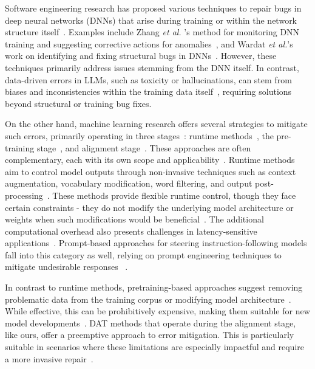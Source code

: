 Software engineering research has proposed various techniques to repair bugs in deep neural networks (DNNs) that arise during training or within the network structure itself~\cite{zhang2019apricot,zhang2021autotrainer,wardat2022deepdiagnosis,ma2018mode}. Examples include Zhang \textit{et al.} 's method for monitoring DNN training and suggesting corrective actions for anomalies~\cite{zhang2021autotrainer}, and Wardat \textit{et al.}'s work on identifying and fixing structural bugs in DNNs~\cite{wardat2022deepdiagnosis}. However, these techniques primarily address issues stemming from the DNN itself. In contrast, data-driven errors in LLMs, such as toxicity or hallucinations, can stem from biases and inconsistencies within the training data itself~\cite{ji2023survey}, requiring solutions beyond structural or training bug fixes.

On the other hand, machine learning research offers several strategies to mitigate such errors, primarily operating in three stages~\cite{wang2022exploring,korbak2023pretraining,pan2023automatically}: runtime methods~\cite{liu2021dexperts,dathathri2019plug,wang2022exploring,schick2021self,leong2023self,yang2022unified,xu2022leashing,niu2024parameter,weng2023large},  the pre-training stage~\cite{korbak2023pretraining,liu2024exposing,huang2023survey}, and alignment stage~\cite{wang2022exploring,gehman2020realtoxicityprompts,lee2024mechanistic,liu2023chain,rafailov2024direct}. These approaches are often complementary, each with its own scope and applicability~\cite{huang2023survey}. 
Runtime methods aim to control model outputs through non-invasive techniques such as context augmentation, vocabulary modification, word filtering, and output post-processing~\cite{dathathri2019plug,wang2022exploring,huang2023survey}. These methods provide flexible runtime control, though they face certain constraints - they do not modify the underlying model architecture or weights when such modifications would be beneficial~\cite{wang2022exploring}. The additional computational overhead also presents challenges in latency-sensitive applications~\cite{wang2022exploring}. Prompt-based approaches for steering instruction-following models fall into this category as well, relying on prompt engineering techniques to mitigate undesirable responses ~\cite{ganguli2023capacity, xie2023defending}.

In contrast to runtime methods, pretraining-based approaches suggest removing problematic data from the training corpus or modifying model architecture~\cite{korbak2023pretraining,
liu2024exposing}. While effective, this can be prohibitively expensive, making them suitable for new model developments~\cite{wang2022exploring}. DAT methods that operate during the alignment stage, like ours, offer a preemptive approach to error mitigation. This is particularly suitable in scenarios where these limitations are especially impactful and require a more invasive repair~\cite{wang2022exploring, lee2024mechanistic}.




